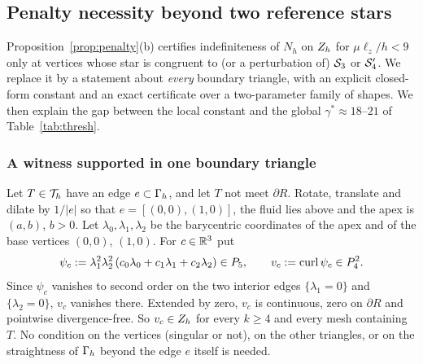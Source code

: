 \subsection{Penalty necessity beyond two reference stars}\label{pb:sec}

Proposition~\ref{prop:penalty}(b) certifies indefiniteness of $N_h$ on $Z_h$ for $\mu\ell_z/h<9$ only at vertices whose star is
congruent to (or a perturbation of) $\mathcal S_3$ or $\mathcal S_4'$. We replace it by a statement about \emph{every} boundary triangle, with
an explicit closed-form constant and an exact certificate over a two-parameter family of shapes. We then explain the gap
between the local constant and the global $\gamma^\ast\approx18$--$21$ of Table~\ref{tab:thresh}.

\subsubsection{A witness supported in one boundary triangle}

Let $T\in\mathcal T_h$ have an edge $e\subset\Gamma_h$, and let $T$ not meet $\partial R$. Rotate, translate and dilate by $1/|e|$ so that
$e=[(0,0),(1,0)]$, the fluid lies above and the apex is $(a,b)$, $b>0$. Let $\lambda_0,\lambda_1,\lambda_2$ be the barycentric
coordinates of the apex and of the base vertices $(0,0)$, $(1,0)$. For $c\in\mathbb R^3$ put
\[
\psi_c:=\lambda_1^2\lambda_2^2\,(c_0\lambda_0+c_1\lambda_1+c_2\lambda_2)\in P_5,\qquad v_c:=\operatorname{curl}\psi_c\in P_4^2 .
\]
Since $\psi_c$ vanishes to second order on the two interior edges $\{\lambda_1=0\}$ and $\{\lambda_2=0\}$, $v_c$ vanishes there.
Extended by zero, $v_c$ is continuous, zero on $\partial R$ and pointwise divergence-free. So $v_c\in Z_h$ for every $k\ge4$ and
every mesh containing $T$. No condition on the vertices (singular or not), on the other triangles, or on the straightness of
$\Gamma_h$ beyond the edge $e$ itself is needed.

